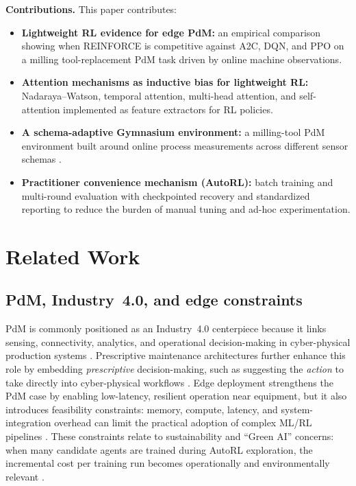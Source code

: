 \documentclass[sn-basic]{sn-jnl} %
\begin{document}
\textbf{Contributions.}
This paper contributes:
\begin{itemize}
		\item \textbf{Lightweight RL evidence for edge PdM:} an empirical comparison showing when \textsc{REINFORCE} is competitive against \textsc{A2C}, \textsc{DQN}, and \textsc{PPO} on a milling tool-replacement PdM task driven by online machine observations.
		\item \textbf{Attention mechanisms as inductive bias for lightweight RL:} Nadaraya--Watson, temporal attention, multi-head attention, and self-attention implemented as feature extractors for RL policies.
		\item \textbf{A schema-adaptive Gymnasium environment:} a milling-tool PdM environment built around online process measurements across different sensor schemas \cite{Foundation2023}.
		\item \textbf{Practitioner convenience mechanism (AutoRL):} batch training and multi-round evaluation with checkpointed recovery and standardized reporting to reduce the burden of manual tuning and ad-hoc experimentation.
\end{itemize}

\section{Related Work}
\subsection{PdM, Industry~4.0, and edge constraints}
PdM is commonly positioned as an Industry~4.0 centerpiece because it links sensing, connectivity, analytics, and operational decision-making in cyber-physical production systems \cite{Compare2020, Zonta2020}. Prescriptive maintenance architectures further enhance this role by embedding \emph{prescriptive} decision-making, such as suggesting the \emph{action} to take directly into cyber-physical workflows \cite{Ansari2019}. Edge deployment strengthens the PdM case by enabling low-latency, resilient operation near equipment, but it also introduces feasibility constraints: memory, compute, latency, and system-integration overhead can limit the practical adoption of complex ML/RL pipelines \cite{Njor2024, Pandey2023}. These constraints relate to sustainability and ``Green AI'' concerns: when many candidate agents are trained during AutoRL exploration, the incremental cost per training run becomes operationally and environmentally relevant \cite{Schwartz2020, Strubell2019}.
\end{document}

